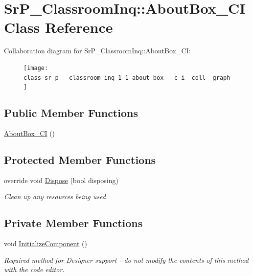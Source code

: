 \hypertarget{class_sr_p___classroom_inq_1_1_about_box___c_i}{
\section{\-Sr\-P\-\_\-\-Classroom\-Inq\-:\-:\-About\-Box\-\_\-\-C\-I \-Class \-Reference}
\label{class_sr_p___classroom_inq_1_1_about_box___c_i}
}


\-Collaboration diagram for \-Sr\-P\-\_\-\-Classroom\-Inq\-:\-:\-About\-Box\-\_\-\-C\-I\-:
\nopagebreak
\begin{figure}[H]
\begin{center}
\leavevmode
\texttt{[image: class\_sr\_p\_\_\_classroom\_inq\_1\_1\_about\_box\_\_\_c\_i\_\_coll\_\_graph]}
\end{center}
\end{figure}
\subsection*{\-Public \-Member \-Functions}
\begin{DoxyCompactItemize}
\item 
\hyperlink{class_sr_p___classroom_inq_1_1_about_box___c_i_a934d9846306f3178ae0226075ffb74a4}{\-About\-Box\-\_\-\-C\-I} ()
\end{DoxyCompactItemize}
\subsection*{\-Protected \-Member \-Functions}
\begin{DoxyCompactItemize}
\item 
override void \hyperlink{class_sr_p___classroom_inq_1_1_about_box___c_i_ae5067d87681378522d6c89d961b97916}{\-Dispose} (bool disposing)
\begin{DoxyCompactList}\small\item\em \-Clean up any resources being used. \end{DoxyCompactList}\end{DoxyCompactItemize}
\subsection*{\-Private \-Member \-Functions}
\begin{DoxyCompactItemize}
\item 
void \hyperlink{class_sr_p___classroom_inq_1_1_about_box___c_i_ad6be5745e3405079d6717e7a7462c649}{\-Initialize\-Component} ()
\begin{DoxyCompactList}\small\item\em \-Required method for \-Designer support -\/ do not modify the contents of this method with the code editor. \end{DoxyCompactList}\end{DoxyCompactItemize}
